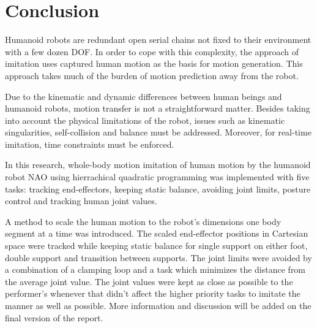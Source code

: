 \chapter*{Conclusion}


Humanoid robots are redundant open serial chains not fixed to their environment with a few 
dozen DOF. In order to cope with this complexity, the approach of imitation uses captured 
human motion as the basis for motion generation. This approach takes much of the burden of 
motion prediction away from the robot.

Due to the kinematic and dynamic differences between human beings and humanoid robots, motion 
transfer is not a straightforward matter. Besides taking into account the physical limitations
 of the robot, issues such as kinematic singularities, self-collision and balance must be 
 addressed. Moreover, for real-time imitation, time constraints must be enforced.


In this research, whole-body motion imitation of human motion by the humanoid robot NAO 
using hierrachical quadratic programming was implemented with five tasks: tracking 
end-effectors, keeping static balance, avoiding joint limits, posture control and tracking human joint values. 

A method to scale the human motion to the robot’s dimensions one body segment at a time was introduced. 
The scaled end-effector positions in Cartesian space were tracked while keeping static balance for single 
support on either foot, double support and transition between supports. The joint limits were avoided 
by a combination of a clamping loop and a task which minimizes the distance from the average joint value. 
The joint values were kept as close as possible to the performer’s whenever that didn’t affect the higher 
priority tasks to imitate the manner as well as possible. More information and discussion will be added on the 
final version of the report.
